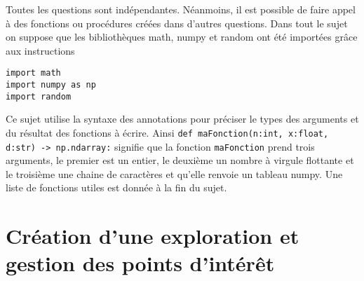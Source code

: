 
Toutes les questions
sont indépendantes. Néanmoins, il est possible de faire appel à des fonctions ou procédures créées dans d’autres
questions. Dans tout le sujet on suppose que les bibliothèques math, numpy et random ont été importées grâce
aux instructions
\begin{lstlisting}
import math
import numpy as np
import random
\end{lstlisting}

Ce sujet utilise la syntaxe des annotations pour préciser le types des arguments et du résultat des fonctions à
écrire. Ainsi
\texttt{def maFonction(n:int, x:float, d:str) -> np.ndarray:}
signifie que la fonction \texttt{maFonction} prend trois arguments, le premier est un entier, le deuxième un nombre à
virgule flottante et le troisième une chaine de caractères et qu’elle renvoie un tableau numpy.
Une liste de fonctions utiles est donnée à la fin du sujet.


\section{Création d’une exploration et gestion des points d’intérêt}

